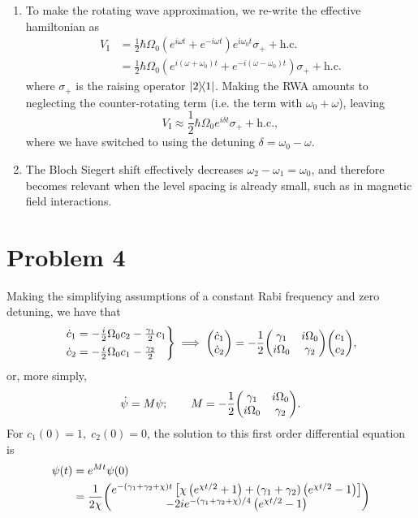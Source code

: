 \documentclass[12pt]{article}
\begin{document}
\begin{enumerate}[label=(\alph*)]
    \item To make the rotating wave approximation, we re-write the effective hamiltonian as
    \begin{align*}
        V_\text{I} &= \frac{1}{2}\hbar\Omega_0\left(e^{i\omega t} + e^{-i\omega t}\right)e^{i\omega_0 t}\sigma_+ + \text{h.c.} \\
        &= \frac{1}{2}\hbar\Omega_0\left(e^{i(\omega + \omega_0)t} + e^{-i(\omega - \omega_0)t}\right)\sigma_+ + \text{h.c.}
    \end{align*}
    where $\sigma_+$ is the raising operator $\dyad{2}{1}$. Making the RWA amounts to neglecting the counter-rotating term (i.e. the term with $\omega_0 + \omega$), leaving
    \[ V_\text{I} \approx \frac{1}{2}\hbar\Omega_0e^{i\delta t}\sigma_+ + \text{h.c.}, \]
    where we have switched to using the detuning $\delta = \omega_0 - \omega$.

    \item The Bloch Siegert shift effectively decreases $\omega_2 - \omega_1 = \omega_0$, and therefore becomes relevant when the level spacing is already small, such as in magnetic field interactions.
\end{enumerate}

\section*{Problem 4}
Making the simplifying assumptions of a constant Rabi frequency and zero detuning, we have that
\begin{equation*}
    \begin{rcases*}
        \dot{c}_1 = -\frac{i}{2}\Omega_0c_2 -\frac{\gamma_1}{2}c_1 \\
        \dot{c}_2 = -\frac{i}{2}\Omega_0c_1 - \frac{\gamma_2}{2}
    \end{rcases*}
    \implies \mqty(\dot{c}_1\\\dot{c}_2) = -\frac{1}{2}\mqty(\gamma_1&i\Omega_0\\i\Omega_0&\gamma_2)\mqty(c_1\\c_2),
\end{equation*}
or, more simply,
\[ \dot{\psi} = M\psi; \qquad M = -\frac{1}{2}\mqty(\gamma_1&i\Omega_0\\i\Omega_0&\gamma_2). \]
For $c_1(0) = 1,\;c_2(0)=0$, the solution to this first order differential equation is
\begin{align*}
    \psi(t) &= e^{Mt}\psi(0) \\
    &= \frac{1}{2\chi} \mqty(e^{-(\gamma_1 + \gamma_2 + \chi)t}\left[\chi\left(e^{\chi t/2} + 1\right) + (\gamma_1 + \gamma_2)\left(e^{\chi t/2} - 1\right)\right] \\ -2ie^{-(\gamma_1 + \gamma_2 + \chi)/4}\left(e^{\chi t/2} - 1\right) )
\end{align*}


\end{document}
